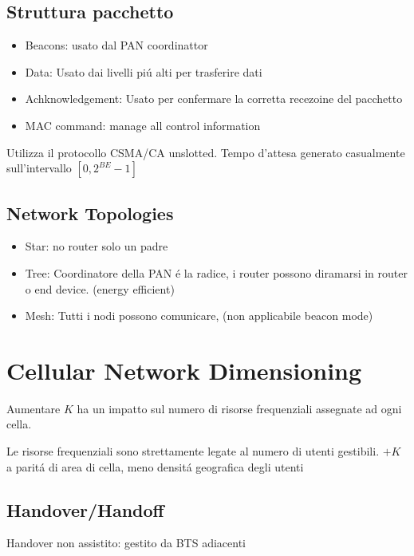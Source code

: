 \documentclass{article}
\begin{document}

\subsection{Struttura pacchetto}
\begin{itemize}
    \item Beacons: usato dal PAN coordinattor
    \item Data: Usato dai livelli pi\'u alti per trasferire dati
    \item Achknowledgement: Usato per confermare la corretta recezoine del pacchetto
    \item MAC command: manage all control information
\end{itemize}

Utilizza il protocollo CSMA/CA unslotted.
Tempo d'attesa generato casualmente sull'intervallo $[0, 2^{BE} - 1]$

\subsection{Network Topologies}
\begin{itemize}
    \item Star: no router solo un padre
    \item Tree: Coordinatore della PAN \'e la radice, i router possono diramarsi in router o end device. (energy efficient)
    \item Mesh: Tutti i nodi possono comunicare, (non applicabile beacon mode)
\end{itemize}

\section{Cellular Network Dimensioning}


Aumentare $K$ ha un impatto sul numero di risorse frequenziali assegnate ad ogni cella.

Le risorse frequenziali sono strettamente legate al numero di utenti gestibili.
$+K$ a parit\'a di area di cella, meno densit\'a geografica degli utenti

\subsection{Handover/Handoff}

Handover non assistito: gestito da BTS adiacenti
\end{document}
